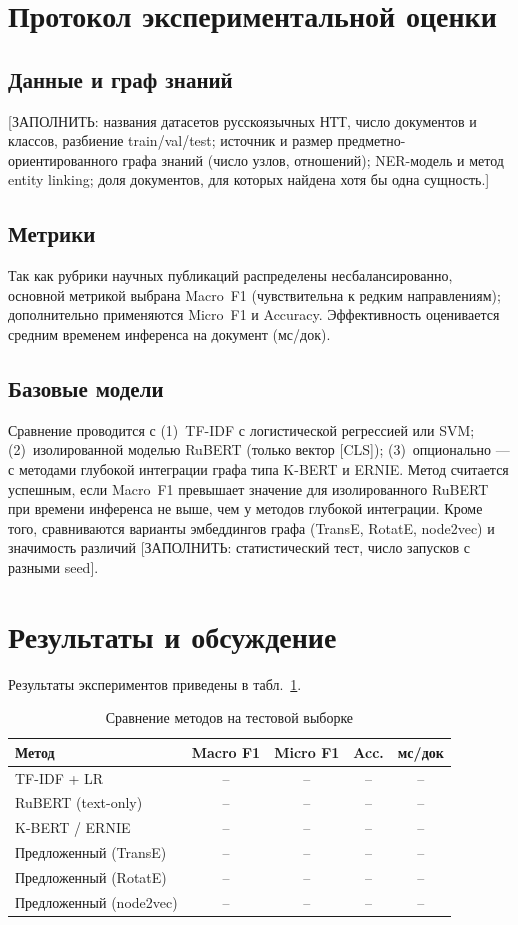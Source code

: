 \documentclass{misisarticle}
\begin{document}
\section{Протокол экспериментальной оценки}
\subsection{Данные и граф знаний}
[ЗАПОЛНИТЬ: названия датасетов русскоязычных НТТ, число документов и классов, разбиение train/val/test; источник и размер предметно-ориентированного графа знаний (число узлов, отношений); NER-модель и метод entity linking; доля документов, для которых найдена хотя бы одна сущность.]

\subsection{Метрики}
Так как рубрики научных публикаций распределены несбалансированно, основной метрикой выбрана Macro~F1 (чувствительна к редким направлениям); дополнительно применяются Micro~F1 и Accuracy. Эффективность оценивается средним временем инференса на документ (мс/док).

\subsection{Базовые модели}
Сравнение проводится с (1)~TF-IDF с логистической регрессией или SVM; (2)~изолированной моделью RuBERT (только вектор [CLS]); (3)~опционально --- с методами глубокой интеграции графа типа K-BERT и ERNIE. Метод считается успешным, если Macro~F1 превышает значение для изолированного RuBERT при времени инференса не выше, чем у методов глубокой интеграции. Кроме того, сравниваются варианты эмбеддингов графа (TransE, RotatE, node2vec) и значимость различий [ЗАПОЛНИТЬ: статистический тест, число запусков с разными seed].

\section{Результаты и обсуждение}
Результаты экспериментов приведены в табл.~\ref{tab:res}.

\begin{table}[t]
\caption{Сравнение методов на тестовой выборке}\label{tab:res}
\centering
\small
\begin{tabular}{lcccc}
\hline
Метод & Macro F1 & Micro F1 & Acc. & мс/док \\
\hline
TF-IDF + LR & -- & -- & -- & -- \\
RuBERT (text-only) & -- & -- & -- & -- \\
K-BERT / ERNIE & -- & -- & -- & -- \\
Предложенный (TransE) & -- & -- & -- & -- \\
Предложенный (RotatE) & -- & -- & -- & -- \\
Предложенный (node2vec) & -- & -- & -- & -- \\
\hline
\end{tabular}
\end{table}
\end{document}
